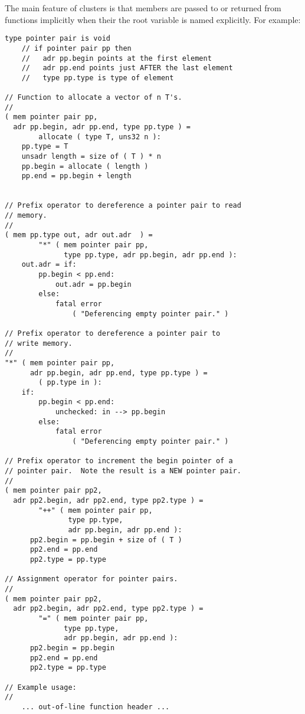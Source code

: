 \documentclass[12pt]{article}
\newenvironment{indpar}[1][0.3in]%
	{\begin{list}{}%
		     {\setlength{\itemsep}{0in}%
		      \setlength{\topsep}{0in}%
		      \setlength{\parsep}{1ex}%
		      \setlength{\labelwidth}{#1}%
		      \setlength{\leftmargin}{#1}%
		      \addtolength{\leftmargin}{\labelsep}}%
	 \item}%
	{\end{list}}
\begin{document}
The main feature of clusters is that members are passed to or returned
from functions implicitly when their the root variable is named
explicitly.  For example:
\begin{indpar}\begin{verbatim}
type pointer pair is void
    // if pointer pair pp then
    //   adr pp.begin points at the first element
    //   adr pp.end points just AFTER the last element
    //   type pp.type is type of element

// Function to allocate a vector of n T's.
//
( mem pointer pair pp,
  adr pp.begin, adr pp.end, type pp.type ) =
        allocate ( type T, uns32 n ):
    pp.type = T
    unsadr length = size of ( T ) * n
    pp.begin = allocate ( length )
    pp.end = pp.begin + length


// Prefix operator to dereference a pointer pair to read
// memory.
//
( mem pp.type out, adr out.adr  ) =
        "*" ( mem pointer pair pp,
              type pp.type, adr pp.begin, adr pp.end ):
    out.adr = if:
        pp.begin < pp.end:
            out.adr = pp.begin
        else:
            fatal error
                ( "Deferencing empty pointer pair." )

// Prefix operator to dereference a pointer pair to
// write memory.
//
"*" ( mem pointer pair pp,
      adr pp.begin, adr pp.end, type pp.type ) =
        ( pp.type in ):
    if:
        pp.begin < pp.end:
            unchecked: in --> pp.begin
        else:
            fatal error
                ( "Deferencing empty pointer pair." )

// Prefix operator to increment the begin pointer of a
// pointer pair.  Note the result is a NEW pointer pair.
//
( mem pointer pair pp2,
  adr pp2.begin, adr pp2.end, type pp2.type ) =
        "++" ( mem pointer pair pp,
               type pp.type,
               adr pp.begin, adr pp.end ):
      pp2.begin = pp.begin + size of ( T )
      pp2.end = pp.end
      pp2.type = pp.type

// Assignment operator for pointer pairs.
//
( mem pointer pair pp2,
  adr pp2.begin, adr pp2.end, type pp2.type ) =
        "=" ( mem pointer pair pp,
              type pp.type,
              adr pp.begin, adr pp.end ):
      pp2.begin = pp.begin
      pp2.end = pp.end
      pp2.type = pp.type

// Example usage:
//
    ... out-of-line function header ...


\end{verbatim}
\end{indpar}
\end{document}
